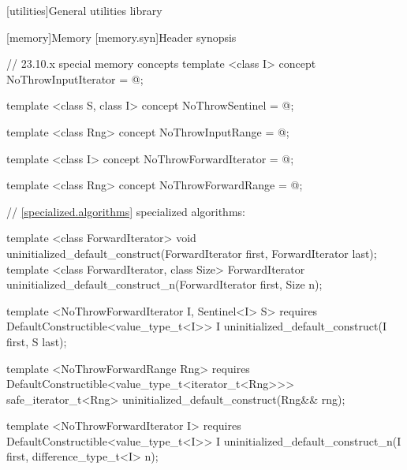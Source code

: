 \setcounter{chapter}{22}
[utilities]{General utilities library}

\setcounter{section}{9}
[memory]{Memory}
\setcounter{subsection}{1}
[memory.syn]{Header  synopsis}

{\color{addclr}
\begin{codeblock}
// 23.10.x special memory concepts
template <class I>
concept NoThrowInputIterator = @\seebelow@;

template <class S, class I>
concept NoThrowSentinel = @\seebelow@;

template <class Rng>
concept NoThrowInputRange = @\seebelow@;

template <class I>
concept NoThrowForwardIterator = @\seebelow@;

template <class Rng>
concept NoThrowForwardRange = @\seebelow@;
\end{codeblock}
} %

\begin{codeblock}
// \ref{specialized.algorithms} specialized algorithms:
\end{codeblock}
{\color{remclr}
\begin{codeblock}
template <class ForwardIterator>
  void uninitialized_default_construct(ForwardIterator first, ForwardIterator last);
template <class ForwardIterator, class Size>
  ForwardIterator uninitialized_default_construct_n(ForwardIterator first, Size n);
\end{codeblock}
} %
{\color{addclr}
\begin{codeblock}
template <NoThrowForwardIterator I, Sentinel<I> S>
  requires
DefaultConstructible<value_type_t<I>>
  I uninitialized_default_construct(I first, S last);

template <NoThrowForwardRange Rng>
  requires
DefaultConstructible<value_type_t<iterator_t<Rng>>>
  safe_iterator_t<Rng> uninitialized_default_construct(Rng&& rng);

template <NoThrowForwardIterator I>
  requires
DefaultConstructible<value_type_t<I>>
  I uninitialized_default_construct_n(I first, difference_type_t<I> n);
\end{codeblock}
} %

